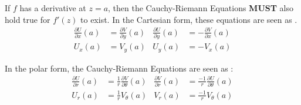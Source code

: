 If $f$ has a derivative at $z = a$, then the Cauchy-Riemann Equations \textbf{MUST} also hold true for $f'(z)$ to exist.
In the Cartesian form, these equations are seen as .
\begin{subequations}\label{eq:Cauchy_Riemann_Equations-Cartesian}
  \begin{equation}\label{subeq:Cauchy_Riemann_Equation-UxVy}
    \begin{aligned}
      \frac{\partial U}{\partial x} (a) &= \frac{\partial V}{\partial y} (a) \\
      U_{x} (a) &= V_{y} (a)
    \end{aligned}
  \end{equation}
  \begin{equation}\label{subeq:Cauchy_Riemann_Equation-UyVx}
    \begin{aligned}
      \frac{\partial U}{\partial y} (a) &= -\frac{\partial V}{\partial x} (a) \\
      U_{y} (a) &= -V_{x} (a)
    \end{aligned}
  \end{equation}
\end{subequations}

In the polar form, the Cauchy-Riemann Equations are seen as :
\begin{subequations}\label{eq:Cauchy_Riemann_Equations-Polar}
  \begin{equation}\label{subeq:Cauchy_Riemann_Equations-UrVt}
    \begin{aligned}
      \frac{\partial U}{\partial r} (a) &= \frac{1}{r} \frac{\partial V}{\partial \theta} (a)\\
      U_{r} (a) &= \frac{1}{r} V_{\theta} (a)
    \end{aligned}
  \end{equation}
  \begin{equation}\label{subeq:Cauchy_Riemann_Equations-UtVr}
    \begin{aligned}
      \frac{\partial V}{\partial r} (a) &= \frac{-1}{r} \frac{\partial U}{\partial \theta} (a) \\
      V_{r} (a) &= \frac{-1}{r} V_{\theta} (a)
    \end{aligned}
  \end{equation}
\end{subequations}

